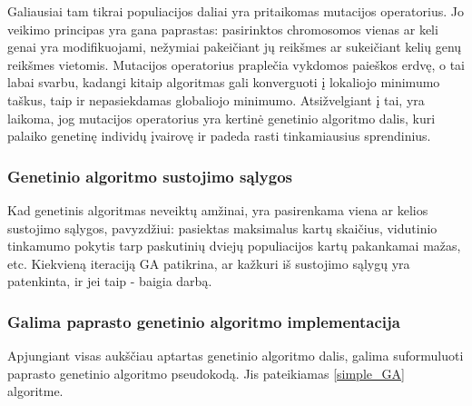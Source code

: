 \documentclass{VUMIFInfKursinis}
\begin{document}

Galiausiai tam tikrai populiacijos daliai yra pritaikomas mutacijos operatorius.
Jo veikimo principas yra gana paprastas: pasirinktos chromosomos vienas ar keli genai yra modifikuojami,
nežymiai pakeičiant jų reikšmes ar sukeičiant kelių genų reikšmes vietomis.
Mutacijos operatorius praplečia vykdomos paieškos erdvę, o tai labai svarbu, kadangi kitaip algoritmas gali konverguoti
į lokaliojo minimumo taškus, taip ir nepasiekdamas globaliojo minimumo.
Atsižvelgiant į tai, yra laikoma, jog mutacijos operatorius yra kertinė genetinio algoritmo dalis,
kuri palaiko genetinę individų įvairovę ir padeda rasti tinkamiausius sprendinius.

\subsubsection{Genetinio algoritmo sustojimo sąlygos}

Kad genetinis algoritmas neveiktų amžinai, yra pasirenkama viena ar kelios sustojimo sąlygos, pavyzdžiui: pasiektas maksimalus
kartų skaičius, vidutinio tinkamumo pokytis tarp paskutinių dviejų populiacijos kartų pakankamai mažas, etc.
Kiekvieną iteraciją GA patikrina, ar kažkuri iš sustojimo sąlygų yra patenkinta, ir jei taip - baigia darbą.

\subsubsection{Galima paprasto genetinio algoritmo implementacija}

Apjungiant visas aukščiau aptartas genetinio algoritmo dalis, galima suformuluoti paprasto genetinio algoritmo pseudokodą.
Jis pateikiamas \ref{simple_GA} algoritme.
\end{document}
